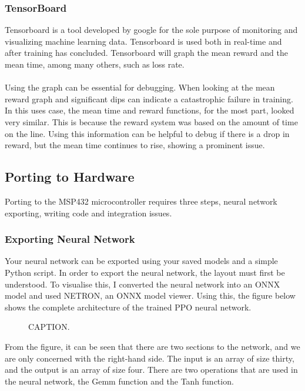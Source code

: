 \documentclass[a4paper,11pt]{article}
\begin{document}
\subsubsection{TensorBoard}

Tensorboard is a tool developed by google for the sole purpose of monitoring and visualizing machine learning data. Tensorboard is used both in real-time and after training has concluded. Tensorboard will graph the mean reward and the mean time, among many others, such as loss rate. 
\\\\
Using the graph can be essential for debugging. When looking at the mean reward graph and significant dips can indicate a catastrophic failure in training. In this uses case, the mean time and reward functions, for the most part, looked very similar. This is because the reward system was based on the amount of time on the line. Using this information can be helpful to debug if there is a drop in reward, but the mean time continues to rise, showing a prominent issue.

\subsection{Porting to Hardware}

Porting to the MSP432 microcontroller requires three steps, neural network exporting, writing code and integration issues. 

\subsubsection{Exporting Neural Network}
Your neural network can be exported using your saved models and a simple Python script. In order to export the neural network, the layout must first be understood. To visualise this, I converted the neural network into an ONNX model and used NETRON, an ONNX model viewer. Using this, the figure below shows the complete architecture of the trained PPO neural network. 

\begin{figure}[H]
\label{fig:1}
\centering
\caption{CAPTION.}
\end{figure}


From the figure, it can be seen that there are two sections to the network, and we are only concerned with the right-hand side. The input is an array of size thirty, and the output is an array of size four. There are two operations that are used in the neural network, the Gemm function and the Tanh function. 
\end{document}
